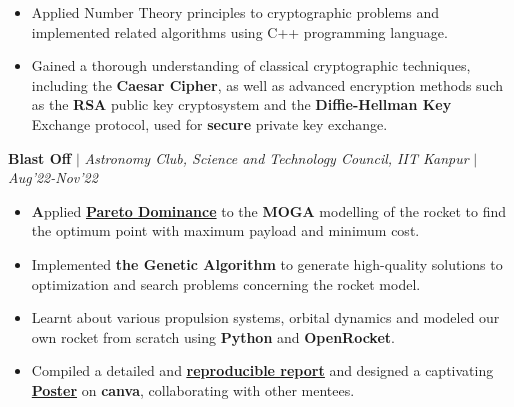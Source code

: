 \documentclass[10pt]{extarticle}
\begin{document}
\vspace{-7pt}

\begin{itemize}
  \item Applied Number Theory principles to cryptographic problems and  implemented related algorithms using C++ programming language.
  \item Gained a thorough understanding of classical cryptographic techniques, including the \textbf{Caesar Cipher}, as well as advanced encryption  methods such as the \textbf{RSA} public key cryptosystem and the \textbf{Diffie-Hellman  Key} Exchange protocol, used for \textbf{secure} private key exchange.
 
\end{itemize}
\vspace{-4pt}



\begin{tcolorbox}[center, width=20.7cm, colback=black!10]
\textbf{Blast Off} $|$ \textit{Astronomy Club, Science and Technology Council, IIT Kanpur
} $|$ \href{https://github.com/Amber404/Blast-Off}{\faGithub}\textit{}
\hfill\hfill\textcolor{black!70}{\small \textit{Aug'22-Nov'22}}
\end{tcolorbox}
\vspace{-7pt}

\begin{itemize}
  \item \textbf Applied \textbf{{\href{}{Pareto Dominance}}}  to the \textbf{MOGA} modelling of the rocket to find the optimum point with maximum payload  and minimum cost.
  \item Implemented \textbf{the Genetic Algorithm} to generate high-quality solutions to optimization and search problems concerning the rocket model.
  \item Learnt about various propulsion systems, orbital dynamics and modeled our own rocket from scratch using \textbf{Python} and \textbf{OpenRocket}.
  \item Compiled a detailed and \textbf{\underline{\href{https://astroclubiitk.github.io/assets/docs/projects/2022/Blast_Off/Handbook.pdf}{reproducible report}}}  and designed a captivating\textbf{{\href{https://astroclubiitk.github.io/assets/docs/projects/2022/Blast_Off/Poster.pdf} { Poster}}} on \textbf{canva},  collaborating  with other mentees.
\end{itemize}
\end{document}

